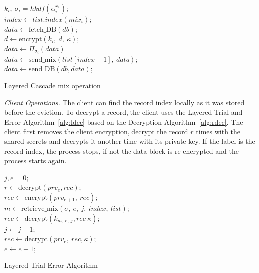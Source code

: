\documentclass[USenglish,oneside,twocolumn]{article}
\begin{document}
\begin{algorithm}
\DontPrintSemicolon
{}
$k_i,\ \sigma_{i}=hkdf(\alpha_{i}^{x_i})$;\\
$index \gets list.index(mix_i)$;\\
{
$data \gets \text{fetch\_DB}(db)$;\\
}
{
	$d \gets \text{encrypt}\left(k_i,\ d,\ \kappa\right)$;\\
}
$data \gets \Pi_{\sigma_i}(data)$\\
{
$data \gets \text{send\_mix}(list[index+1],\ data)$;\\
}
\Else
{
$data \gets \text{send\_DB}(db, data)$;\\
}
\caption{Layered Cascade mix operation}
\label{alg:CL}
\end{algorithm}

\noindent\textit{Client Operations.} The client can find the record index locally as it was stored before the eviction. To decrypt a record, the client uses the Layered Trial and Error Algorithm~\ref{alg:ldec} based on the Decryption Algorithm~\ref{alg:rdec}. The client first removes the client encryption, decrypt the record $r$ times with the shared secrets and decrypts it another time with its private key. If the label is the record index, the process stops, if not the data-block is re-encrypted and the process starts again.

\vspace{-.5cm}

\begin{algorithm}
\DontPrintSemicolon
{}
$j,e=0$;\\
$r\gets \text{decrypt}(prv_e,rec)$;\\
{
{
$rec \gets \text{encrypt}(prv_{e+1},\ rec)$;\\
}
{
	$m\gets \text{retrieve\_mix}(\sigma,\ e,\ j,\ index,\ list)$;\\
	$rec \gets \text{decrypt}(k_{m,\ e,\ j}, rec\ \kappa)$;\\
	$j\gets j-1$;\\
}
	$rec \gets \text{decrypt}(prv_e,\ rec, \kappa)$;\\
    $e\gets e-1$;\\
}
\caption{Layered Trial Error Algorithm}
\label{alg:ldec}
\end{algorithm}
\end{document}
